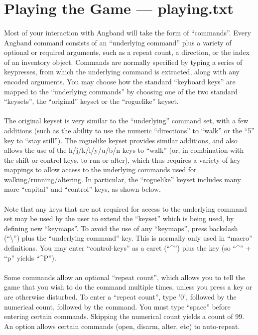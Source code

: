 \section{Playing the Game --- playing.txt}
\paragraph{}Most of your interaction with Angband will take the form of
``commands''.  Every Angband command consists of an ``underlying
command'' plus a variety of optional or required arguments, such as a
repeat count, a direction, or the index of an inventory object. Commands
are normally specified by typing a series of keypresses, from which the
underlying command is extracted, along with any encoded arguments. You
may choose how the standard ``keyboard keys'' are mapped to the
``underlying commands'' by choosing one of the two standard ``keysets'',
the ``original'' keyset or the ``roguelike'' keyset.

\paragraph{}The original keyset is very similar to the ``underlying''
command set, with a few additions (such as the ability to use the
numeric ``directions'' to ``walk'' or the ``5'' key to ``stay still'').
The roguelike keyset provides similar additions, and also allows the use
of the h/j/k/l/y/u/b/n keys to ``walk'' (or, in combination with the
shift or control keys, to run or alter), which thus requires a variety
of key mappings to allow access to the underlying commands used for
walking/running/altering. In particular, the ``roguelike'' keyset
includes many more ``capital'' and ``control'' keys, as shown below.

\paragraph{}Note that any keys that are not required for access to the
underlying command set may be used by the user to extend the ``keyset''
which is being used, by defining new ``keymaps''. To avoid the use of
any ``keymaps'', press backslash (``\textbackslash '') plus the
``underlying command''
key. This is normally only used in ``macro'' definitions. You may enter
``control-keys'' as a caret (``\^{}'') plus the key (so ``\^{}'' + ``p''
yields ``\^{}P'').

\paragraph{}Some commands allow an optional ``repeat count'', which
allows you to tell the game that you wish to do the command multiple
times, unless you press a key or are otherwise disturbed. To enter a
``repeat count'', type '0', followed by the numerical count, followed by
the command. You must type ``space'' before entering certain commands.
Skipping the numerical count yields a count of 99.  An option allows
certain commands (open, disarm, alter, etc) to auto-repeat.

